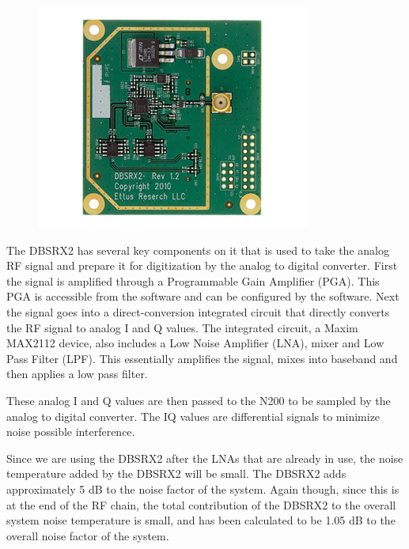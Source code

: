 {\begin{figure}[h!tb] 
\centering
\includegraphics{Images/dbsrx2.jpg}
\label{dbsrx2}
\end{figure}
}

The DBSRX2 has several key components on it that is used to take the analog RF signal and prepare it for digitization by the analog to digital converter.  First the signal is amplified through a Programmable Gain Amplifier (PGA).  This PGA is accessible from the software and can be configured by the software.  Next the signal goes into a direct-conversion integrated circuit that directly converts the RF signal to analog I and Q values.  The integrated circuit, a Maxim MAX2112 device, also includes a Low Noise Amplifier (LNA), mixer and Low Pass Filter (LPF).  This essentially amplifies the signal, mixes into baseband and then applies a low pass filter.  


These analog I and Q values are then passed to the N200 to be sampled by the analog to digital converter.  The IQ values are differential signals to minimize noise possible interference.

Since we are using the DBSRX2 after the LNAs that are already in use, the noise temperature added by the DBSRX2 will be small.  The DBSRX2 adds approximately 5 dB to the noise factor of the system.  Again though, since this is at the end of the RF chain, the total contribution of the DBSRX2 to the overall system noise temperature is small, and has been calculated to be 1.05 dB to the overall noise factor of the system.

